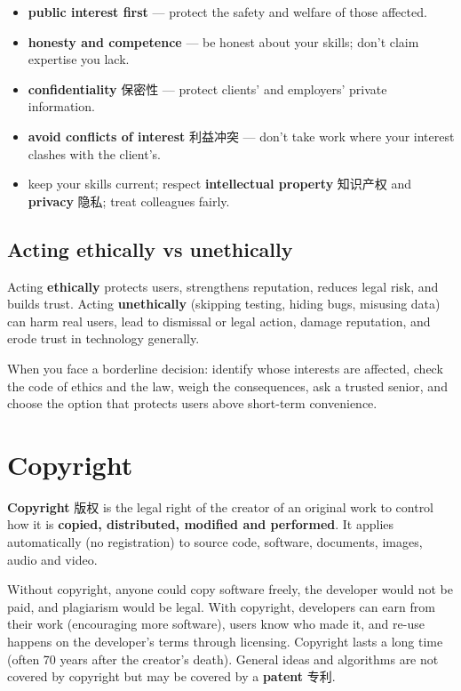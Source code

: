 \documentclass[11pt]{article}
\begin{document}
\begin{itemize}
\item \textbf{public interest first} — protect the safety and welfare of those affected.

\item \textbf{honesty and competence} — be honest about your skills; don't claim expertise you lack.

\item \textbf{confidentiality} 保密性 — protect clients' and employers' private information.

\item \textbf{avoid conflicts of interest} 利益冲突 — don't take work where your interest clashes with the client's.

\item keep your skills current; respect \textbf{intellectual property} 知识产权 and \textbf{privacy} 隐私; treat colleagues fairly.

\end{itemize}

\subsection*{Acting ethically vs unethically}

Acting \textbf{ethically} protects users, strengthens reputation, reduces legal risk, and builds trust. Acting \textbf{unethically} (skipping testing, hiding bugs, misusing data) can harm real users, lead to dismissal or legal action, damage reputation, and erode trust in technology generally.

When you face a borderline decision: identify whose interests are affected, check the code of ethics and the law, weigh the consequences, ask a trusted senior, and choose the option that protects users above short-term convenience.

\section*{Copyright}

\textbf{Copyright} 版权 is the legal right of the creator of an original work to control how it is \textbf{copied, distributed, modified and performed}. It applies automatically (no registration) to source code, software, documents, images, audio and video.

Without copyright, anyone could copy software freely, the developer would not be paid, and plagiarism would be legal. With copyright, developers can earn from their work (encouraging more software), users know who made it, and re-use happens on the developer's terms through licensing. Copyright lasts a long time (often 70 years after the creator's death). General ideas and algorithms are not covered by copyright but may be covered by a \textbf{patent} 专利.
\end{document}

